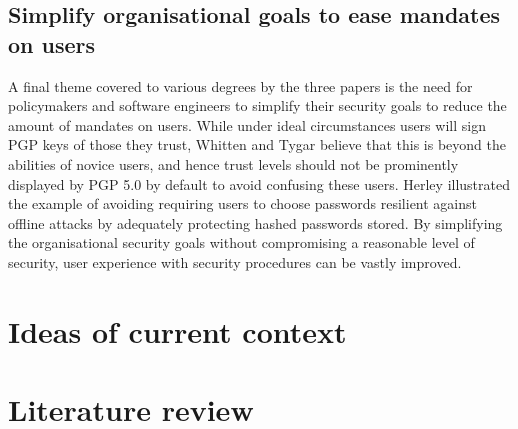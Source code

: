 \documentclass[11pt]{article}
\begin{document}
\subsection{Simplify organisational goals to ease mandates on users}

A final theme covered to various degrees by the three papers is the need for policymakers and software engineers to simplify their security goals to reduce the amount of mandates on users. While under ideal circumstances users will sign PGP keys of those they trust, Whitten and Tygar \cite[4.4]{whitten1999johnny} believe that this is beyond the abilities of novice users, and hence trust levels should not be prominently displayed by PGP 5.0 by default to avoid confusing these users. Herley \cite[2.4]{herley2014more} illustrated the example of avoiding requiring users to choose passwords resilient against offline attacks by adequately protecting hashed passwords stored. By simplifying the organisational security goals without compromising a reasonable level of security, user experience with security procedures can be vastly improved.  

\section{Ideas of current context}

\section{Literature review}



\footnotesize{}
\end{document}
